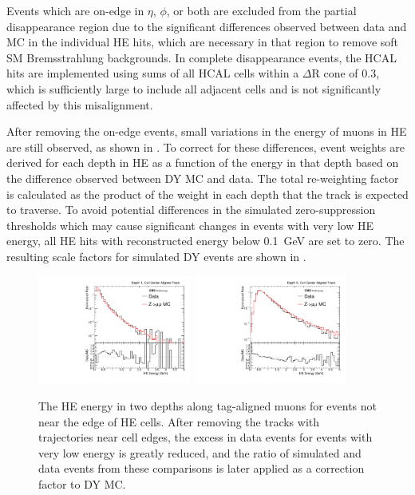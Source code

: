 Events which are on-edge in $\eta$, $\phi$, or both are excluded from the partial disappearance region due to the significant differences observed between data and MC in the individual HE hits, which are necessary in that region to remove soft SM Bremsstrahlung backgrounds.
In complete disappearance events, the HCAL hits are implemented using sums of all HCAL cells within a $\Delta$R cone of 0.3, which is sufficiently large to include all adjacent cells and is not significantly affected by this misalignment.

After removing the on-edge events, small variations in the energy of muons in HE are still observed, as shown in . 
To correct for these differences, event weights are derived for each depth in HE as a function of the energy in that depth based on the difference observed between DY MC and data.
The total re-weighting factor is calculated as the product of the weight in each depth that the track is expected to traverse.
To avoid potential differences in the simulated zero-suppression thresholds which may cause significant changes in events with very low HE energy, all HE hits with reconstructed energy below \SI{0.1}{\giga\eV} are set to zero.
The resulting scale factors for simulated DY events are shown in .

\begin{figure}[htbp]
	\centering
	\includegraphics[width=0.45\textwidth]{figures/hcalE_depth0.pdf}
        \hspace{0.01\textwidth}
        \includegraphics[width=0.45\textwidth]{figures/hcalE_depth4.pdf}
	\caption[Center-Aligned HE Energy]{The HE energy in two depths along tag-aligned muons for events not near the edge of HE cells. After removing the tracks with trajectories near cell edges, the excess in data events for events with very low energy is greatly reduced, and the ratio of simulated and data events from these comparisons is later applied as a correction factor to DY MC.} 
        \label{fig:nonEdgeHEEnergy}
\end{figure}

